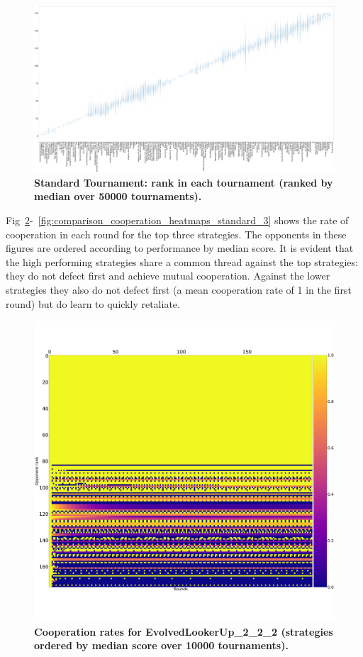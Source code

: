 \documentclass[10pt,letterpaper]{article}
\begin{document}
\begin{landscape}
    \begin{figure}[!hbtp]
        \centering
        \includegraphics[width=\paperwidth]{standard_ranks_boxplots.pdf}
        \caption{\bf Standard Tournament: rank in each tournament (ranked by
        median over
        50000 tournaments).}
        \label{fig:standard_ranks_boxplot}
    \end{figure}
\end{landscape}

Fig~\ref{fig:comparison_cooperation_heatmaps_standard_1}-~\ref{fig:comparison_cooperation_heatmaps_standard_3}
    shows the rate of
cooperation in each round for the top three strategies. The opponents in these
figures are ordered according to performance by median score. It is evident that
the high performing strategies share a common thread against the top strategies:
they do not defect first and achieve mutual cooperation. Against the lower
strategies they also do not defect first (a mean cooperation rate of 1 in the
first round) but do learn to quickly retaliate.

\begin{figure}[!hbtp]
        \centering
        \includegraphics[width=.7\textwidth]{cooperation_0_0_10000_EvolvedLookerUp2_2_2_array.pdf}
        \caption{\bf Cooperation rates for EvolvedLookerUp\_2\_2\_2
            (strategies ordered by median score over 10000 tournaments).}
        \label{fig:comparison_cooperation_heatmaps_standard_1}
\end{figure}
\end{document}
